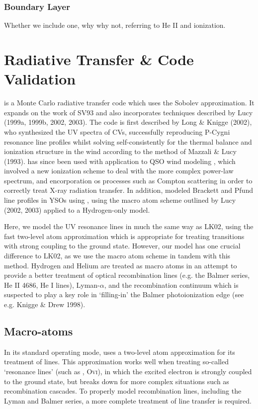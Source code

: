 \documentclass[useAMS,usenatbib, onecolumn]{mn2ejm}
\begin{document}
\subsubsection{Boundary Layer}
Whether we include one, why why not, referring to He II and ionization.



%
%

\section{Radiative Transfer \& Code Validation}

\py is a Monte Carlo radiative transfer code which uses the Sobolev approximation.  
It expands on the work of SV93 and also incorporates techniques described by
Lucy (1999a, 1999b, 2002, 2003). The code is first described by Long \& Knigge (2002),
who synthesized the UV spectra of CVs, successfully reproducing P-Cygni resonance line profiles
whilst solving self-consistently for the thermal balance and ionization structure in the wind
according to the method of Mazzali \& Lucy (1993). \py has since been used with application
to QSO wind modeling \citep{higginbottom2013}, which involved a new ionization scheme to deal with the
more complex power-law spectrum, and encorporation os processes such as Compton scattering in order
to correctly treat X-ray radiation transfer. In addition, \citep{simmacro2005} modeled
Brackett and Pfund line profiles in YSOs using \py, using the macro atom scheme outlined by Lucy (2002, 2003) applied
to a Hydrogen-only model.

Here, we 
model the UV resonance lines in much the same way as LK02, using the 
fast two-level atom approximation which is appropriate for treating transitions with strong
coupling to the ground state. However, our model has one crucial difference to LK02, as we use
the macro atom scheme in tandem with this method. Hydrogen and Helium are treated
as macro atoms in an attempt to provide a better treatment of optical recombination lines (e.g. the Balmer series, He II 4686, He I lines),
Lyman-$\alpha$, and the recombination continuum which is suspected to play a key role in `filling-in' the Balmer
photoionization edge (see e.g. Knigge \& Drew 1998). 


\subsection{Macro-atoms}
In its standard operating mode, \py uses a two-level atom approximation \cite[see e.g.][]{mihalas} for its treatment of lines. This approximation works well when treating so-called `resonance lines' (such as \civ, O\textsc{vi}), in which the excited electron is strongly coupled to the ground state, but breaks down for more complex situations such as recombination cascades. To properly model recombination lines, including the Lyman and Balmer series, a more complete treatment of line transfer is required.
\end{document}
